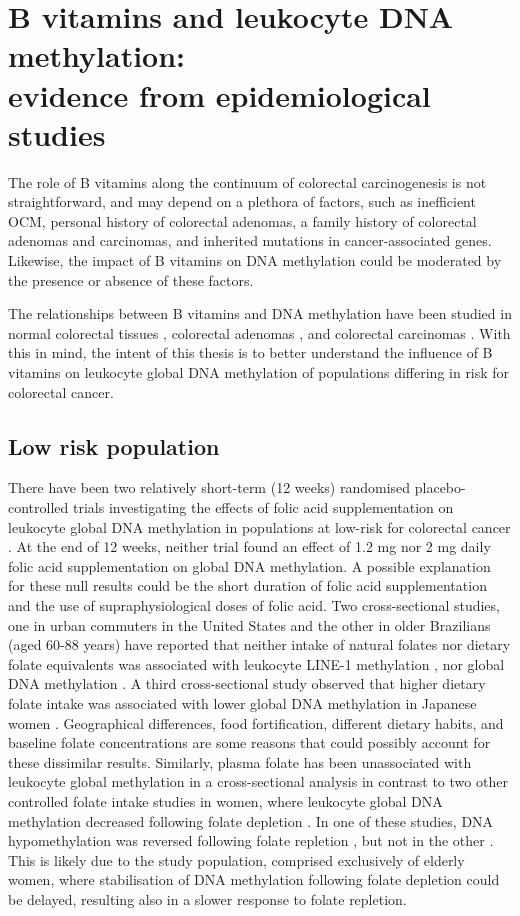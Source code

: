  
\section{B vitamins and leukocyte DNA methylation: \\ evidence from epidemiological studies} %
The role of B vitamins along the continuum of colorectal carcinogenesis is not straightforward, and may depend on a plethora of factors, such as inefficient OCM, personal history of colorectal adenomas, a family history of colorectal adenomas and carcinomas, and inherited mutations in cancer-associated genes. Likewise, the impact of B vitamins on DNA methylation could be moderated by the presence or absence of these factors. 
 
\noindent The relationships between B vitamins and DNA methylation have been studied in normal colorectal tissues \cite{c1104,c1105}, colorectal adenomas \cite{c1106}, and colorectal carcinomas \cite{c1107,c1108}. With this in mind, the intent of this thesis is to better understand the influence of B vitamins on leukocyte global DNA methylation of populations differing in risk for colorectal cancer. 
 
\subsection{Low risk population} %
There have been two relatively short-term (12 weeks) randomised placebo-controlled trials investigating the effects of folic acid supplementation on leukocyte global DNA methylation in populations at low-risk for colorectal cancer \cite{c1109,c1110}. At the end of 12 weeks, neither trial found an effect of 1.2 mg \cite{c1109} nor 2 mg \cite{c1110} daily folic acid supplementation on global DNA methylation. A possible explanation for these null results could be the short duration of folic acid supplementation and the use of supraphysiological doses of folic acid. Two cross-sectional studies, one in urban commuters in the United States and the other in older Brazilians (aged 60-88 years) have reported that neither intake of natural folates nor dietary folate equivalents was associated with leukocyte LINE-1 methylation \cite{c1111}, nor global DNA methylation \cite{c1112}. A third cross-sectional study observed that higher dietary folate intake was associated with lower global DNA methylation in Japanese women \cite{c1113}. Geographical differences, food fortification, different dietary habits, and baseline folate concentrations are some reasons that could possibly account for these dissimilar results. Similarly, plasma folate has been unassociated with leukocyte global methylation in a cross-sectional analysis \cite{c1114} in contrast to two other controlled folate intake studies in women, where leukocyte global DNA methylation decreased following folate depletion \cite{c1115,c1116}. In one of these studies, DNA hypomethylation was reversed following folate repletion \cite{c1115}, but not in the other \cite{c1116}. This is likely due to the study population, comprised exclusively of elderly women, where stabilisation of DNA methylation following folate depletion could be delayed, resulting also in a slower response to folate repletion. 


